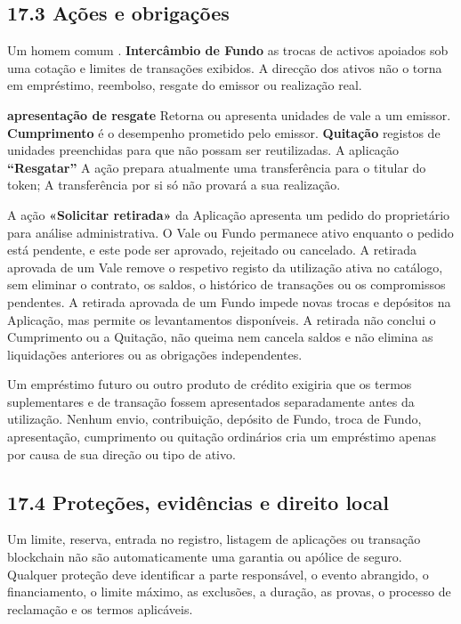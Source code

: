 \documentclass[11pt]{article}
\begin{document}
\subsection*{17.3 Ações e obrigações}

Um homem comum . \textbf{Intercâmbio de Fundo} as trocas de activos apoiados sob uma cotação e limites de transações exibidos. A direcção dos ativos não o torna em empréstimo, reembolso, resgate do emissor ou realização real.

\textbf{apresentação de resgate} Retorna ou apresenta unidades de vale a um emissor. \textbf{Cumprimento} é o desempenho prometido pelo emissor. \textbf{Quitação} registos de unidades preenchidas para que não possam ser reutilizadas. A aplicação \textbf{``Resgatar''} A ação prepara atualmente uma transferência para o titular do token; A transferência por si só não provará a sua realização.

A ação \textbf{«Solicitar retirada»} da Aplicação apresenta um pedido do proprietário para análise administrativa. O Vale ou Fundo permanece ativo enquanto o pedido está pendente, e este pode ser aprovado, rejeitado ou cancelado. A retirada aprovada de um Vale remove o respetivo registo da utilização ativa no catálogo, sem eliminar o contrato, os saldos, o histórico de transações ou os compromissos pendentes. A retirada aprovada de um Fundo impede novas trocas e depósitos na Aplicação, mas permite os levantamentos disponíveis. A retirada não conclui o Cumprimento ou a Quitação, não queima nem cancela saldos e não elimina as liquidações anteriores ou as obrigações independentes.

Um empréstimo futuro ou outro produto de crédito exigiria que os termos suplementares e de transação fossem apresentados separadamente antes da utilização. Nenhum envio, contribuição, depósito de Fundo, troca de Fundo, apresentação, cumprimento ou quitação ordinários cria um empréstimo apenas por causa de sua direção ou tipo de ativo.

\subsection*{17.4 Proteções, evidências e direito local}

Um limite, reserva, entrada no registro, listagem de aplicações ou transação blockchain não são automaticamente uma garantia ou apólice de seguro. Qualquer proteção deve identificar a parte responsável, o evento abrangido, o financiamento, o limite máximo, as exclusões, a duração, as provas, o processo de reclamação e os termos aplicáveis.
\end{document}
